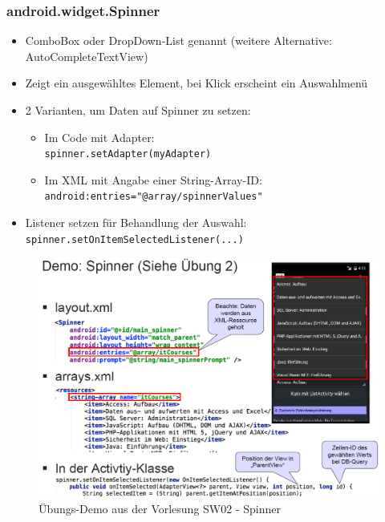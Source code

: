 \documentclass[a4paper]{article}
\begin{document}
\newpage

\subsubsection{android.widget.Spinner}

\begin{itemize}
	\item ComboBox oder DropDown-List genannt (weitere Alternative: AutoCompleteTextView)
	\item Zeigt ein ausgewähltes Element, bei Klick erscheint ein Auswahlmenü
	\item 2 Varianten, um Daten auf Spinner zu setzen:
		\begin{itemize}
			\item Im Code mit Adapter:\\
			\texttt{spinner.setAdapter(myAdapter)}
			\item Im XML mit Angabe einer String-Array-ID:\\
			\texttt{android:entries="@array/spinnerValues"}
		\end{itemize}
	\item Listener setzen für Behandlung der Auswahl:\\
	\texttt{spinner.setOnItemSelectedListener(...)}
\end{itemize}
\vspace{2em}
\begin{figure}[htb!]
	\centering
	\includegraphics[width=\textwidth]{img/spinner_demo.png}
	\caption{Übungs-Demo aus der Vorlesung SW02 - Spinner}
\end{figure}

\newpage
\end{document}
